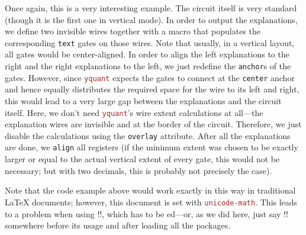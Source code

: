 \documentclass{scrartcl}
\makeatletter
\newenvironment{codeexample*}{%
   \VerbatimEnvironment%
   \let\FVB@VerbatimOut\minted@FVB@VerbatimOut
   \let\FVE@VerbatimOut\minted@FVE@VerbatimOut
   \minted@configlang{tex}%
   \minted@fvset
   \begin{VerbatimOut}[codes={\catcode`\^^I=12},firstline,lastline]{\minted@jobname.pyg}%
}{
   \end{VerbatimOut}%
   \minted@langlinenoson%
   \begin{adjustbox}{center}
       \minted@jobname.pyg %
   \end{adjustbox}\nopagebreak
   \expandafter\minted@pygmentize\expandafter{\minted@lang}%
   \minted@langlinenosoff%
   \par%
}
\def\pkg#1{\textcolor{brown}{\texttt{#1}}}
\def\ttlink{\link\texttt}
\def\texlink{\link\tex}
\def\Yquant{\pkg{yquant}}
\makeatother
\begin{document}
\begin{example}
\begin{codeexample*}
                  \end{codeexample*}
                  Once again, this is a very interesting example.
                  The circuit itself is very standard (though it is the first one in vertical mode).
                  In order to output the explanations, we define two invisible wires together with a macro that populates the corresponding \ttlink{text} gates on those wires.
                  Note that usually, in a vertical layout, all gates would be center\hyp aligned.
                  In order to align the left explanations to the right and the right explanations to the left, we just redefine the \texttt{anchor}s of the gates.
                  However, since \Yquant{} expects the gates to connect at the \texttt{center} anchor and hence equally distributes the required space for the wire to its left and right, this would lead to a very large gap between the explanations and the circuit itself.
                  Here, we don't need \Yquant's wire extent calculations at all---the explanation wires are invisible and at the border of the circuit.
                  Therefore, we just disable the calculations using the \ttlink{overlay} attribute.
                  After all the explanations are done, we \ttlink{align} all registers (if the minimum extent was chosen to be exactly larger or equal to the actual vertical extent of every gate, this would not be necessary; but with two decimals, this is probably not precisely the case).

                  Note that the code example above would work exactly in this way in traditional \LaTeX{} documents; however, this document is set with \pkg{unicode-math}.
                  This leads to a problem when using \tex!\bmod!, which has to be \texlink\protect ed---or, as we did here, just say \tex!\robustify\bmod! somewhere before its usage and after loading all the packages.
               \end{example}
            \endgroup

            \clearpage
\end{document}
